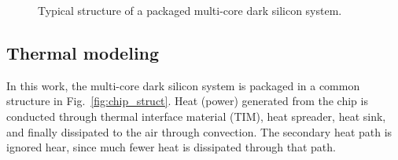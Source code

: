 \begin{figure}
  \centering
\caption{Typical structure of a
    packaged multi-core dark silicon system.}
\end{figure}
\subsection{Thermal modeling}
In this work, the multi-core dark silicon system is packaged in a common structure in Fig.~\ref{fig:chip_struct}. 
Heat (power) generated from the chip is conducted through thermal interface material (TIM), heat spreader, heat sink, and finally dissipated to the air through convection. The secondary heat path is ignored hear, since much fewer heat is dissipated through that path.

